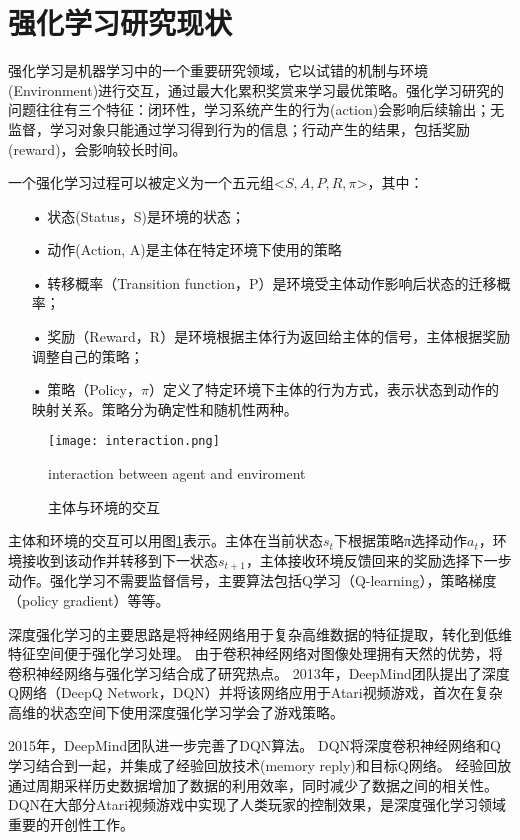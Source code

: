 \section{强化学习研究现状}
\label{sec:rl_intro}
强化学习\cite{Sutton1998ReinforcementL}是机器学习中的一个重要研究领域，它以试错的机制与环境(Environment)进行交互，通过最大化累积奖赏来学习最优策略。强化学习研究的问题往往有三个特征：闭环性，学习系统产生的行为(action)会影响后续输出；无监督，学习对象只能通过学习得到行为的信息；行动产生的结果，包括奖励(reward)，会影响较长时间。

一个强化学习过程可以被定义为一个五元组<$S, A, P, R, \pi$>，其中：
\begin{itemize}
  \item[•] 状态(Status，S)是环境的状态；
  \item[•] 动作(Action, A)是主体在特定环境下使用的策略
  \item[•] 转移概率（Transition function，P）是环境受主体动作影响后状态的迁移概率；
  \item[•] 奖励（Reward，R）是环境根据主体行为返回给主体的信号，主体根据奖励调整自己的策略；
  \item[•] 策略（Policy，$\pi$）定义了特定环境下主体的行为方式，表示状态到动作的映射关系。策略分为确定性和随机性两种。
\end{itemize}

\begin{figure}[!htbp]\centering
  \texttt{[image: interaction.png]}
  \caption{主体与环境的交互}{interaction between agent and enviroment}
  \label{fig:interaction}       %
\end{figure}

主体和环境的交互可以用图\ref{fig:interaction}表示。主体在当前状态$s_t$下根据策略π选择动作$a_t$，环境接收到该动作并转移到下一状态$s_{t+1}$，主体接收环境反馈回来的奖励选择下一步动作。强化学习不需要监督信号，主要算法包括Q学习（Q-learning），策略梯度（policy gradient）等等。

深度强化学习的主要思路是将神经网络用于复杂高维数据的特征提取，转化到低维特征空间便于强化学习处理。
由于卷积神经网络对图像处理拥有天然的优势，将卷积神经网络与强化学习结合成了研究热点。
2013年，DeepMind团队提出了深度Q网络（DeepQ Network，DQN）\cite{Mnih2013PlayingAW}并将该网络应用于Atari视频游戏，首次在复杂高维的状态空间下使用深度强化学习学会了游戏策略。

2015年，DeepMind团队进一步完善了DQN算法\cite{Mnih2015HumanlevelCT}。
DQN将深度卷积神经网络和Q学习结合到一起，并集成了经验回放技术(memory reply)和目标Q网络。
经验回放通过周期采样历史数据增加了数据的利用效率，同时减少了数据之间的相关性。
DQN在大部分Atari视频游戏中实现了人类玩家的控制效果，是深度强化学习领域重要的开创性工作。

